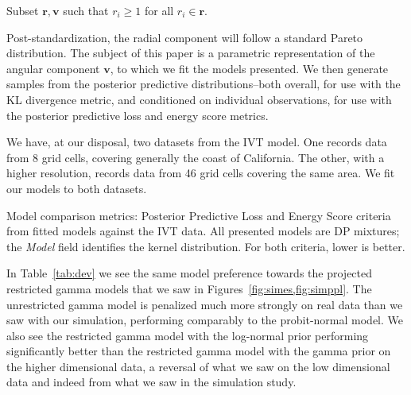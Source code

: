 \begin{algorithm}
  \label{algo:processing}
  Subset $\bm{ r},\bm{ v}$ such that $r_i \geq 1$ for all $r_i\in \bm{r}$.\\
\end{algorithm}

Post-standardization, the radial component will follow a standard Pareto distribution.  The
  subject of this paper is a parametric representation of the angular component $\bm{v}$, to which
  we fit the models presented.  We then generate samples from the posterior predictive
  distributions--both overall, for use with the KL divergence metric, and conditioned on individual
  observations, for use with the posterior predictive loss and energy score metrics.

We have, at our disposal, two datasets from the IVT model.  One records data from 8 grid cells,
  covering generally the coast of California.  The other, with a higher resolution, records data
  from 46 grid cells covering the same area.  We fit our models to both datasets.

\begin{table}[h]
  \label{tab:dev}
  
  \caption{Model comparison metrics: Posterior Predictive Loss and Energy Score criteria from fitted
    models against the IVT data.  All presented models are DP mixtures; the \emph{Model} field
    identifies the kernel distribution.  For both criteria, lower is better.}
\end{table}

In Table~\ref{tab:dev} we see the same model preference towards the projected restricted gamma models
  that we saw in Figures~\ref{fig:simes,fig:simppl}.  The unrestricted gamma model is penalized much
  more strongly on real data than we saw with our simulation, performing comparably to the probit-normal
  model.  We also see the restricted gamma model with the log-normal prior performing significantly
  better than the restricted gamma model with the gamma prior on the higher dimensional data, a reversal
  of what we saw on the low dimensional data and indeed from what we saw in the simulation study.
  

